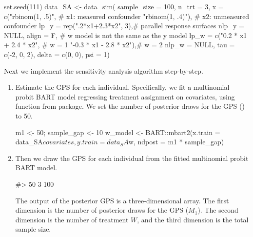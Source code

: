 \begin{Schunk}
\begin{Sinput}
set.seed(111)
data_SA <- data_sim(
  sample_size = 100, n_trt = 3,
  x = c("rbinom(1, .5)",  # x1: measured confounder
        "rbinom(1, .4)"), # x2: unmeasured confounder
  lp_y = rep(".2*x1+2.3*x2", 3),# parallel response surfaces
  nlp_y = NULL,
  align = F, # w model is not the same as the y model
  lp_w = c("0.2 * x1 + 2.4 * x2",  # w = 1
           "-0.3 * x1 - 2.8 * x2"),# w = 2
  nlp_w = NULL,
  tau = c(-2, 0, 2),  delta = c(0, 0), psi = 1)
\end{Sinput}
\end{Schunk}
Next we implement the  sensitivity analysis algorithm step-by-step.
\begin{enumerate}

\item Estimate the GPS for each individual.  Specifically, we fit a multinomial probit BART model regressing treatment assignment on covariates, using  function from  package.  We set the number of posterior draws for the GPS () to 50.

\begin{Schunk}
\begin{Sinput}
m1 <- 50; sample_gap <- 10
w_model <- BART::mbart2(x.train = data_SA$covariates, y.train = data_SA$w,
                        ndpost = m1 * sample_gap) 
\end{Sinput}
\end{Schunk}
\item Then we draw the GPS for each individual from the fitted  multinomial probit BART model.

\begin{Schunk}
\end{Schunk}

\begin{Schunk}
\begin{Soutput}
#> 50 3 100
\end{Soutput}
\end{Schunk}

The output of the posterior GPS is a three-dimensional array. The first dimension  is the number of posterior draws for the GPS ($M_1$). The second dimension is the number of treatment $W$, and the third dimension is the total sample size.


\end{enumerate}
